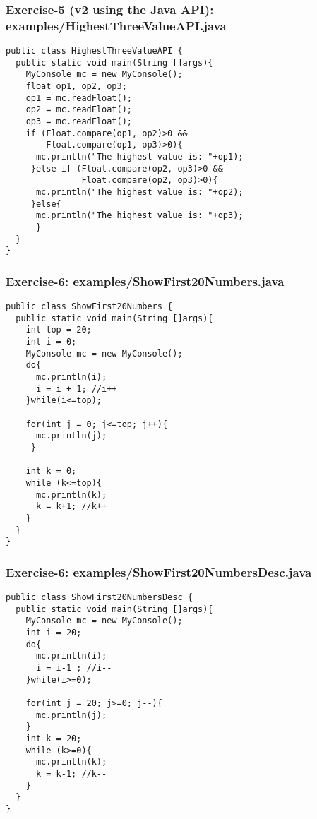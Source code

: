 \documentclass[xcolor=dvipsnames,dvip,notes=show,table]{beamer}
\begin{document}
\begin{frame}[fragile]
\frametitle{Exercise-5 (v2 using the Java API): examples/HighestThreeValueAPI.java}
\scriptsize
\begin{lstlisting}
public class HighestThreeValueAPI {
  public static void main(String []args){
    MyConsole mc = new MyConsole();
    float op1, op2, op3;
    op1 = mc.readFloat();
    op2 = mc.readFloat();
    op3 = mc.readFloat();
    if (Float.compare(op1, op2)>0 && 
        Float.compare(op1, op3)>0){
      mc.println("The highest value is: "+op1);
     }else if (Float.compare(op2, op3)>0 && 
               Float.compare(op2, op3)>0){
      mc.println("The highest value is: "+op2);
     }else{
      mc.println("The highest value is: "+op3);
      }
  }
}
\end{lstlisting}
\end{frame}




\begin{frame}[fragile]
\frametitle{Exercise-6: examples/ShowFirst20Numbers.java}
\scriptsize
\begin{lstlisting}
public class ShowFirst20Numbers {
  public static void main(String []args){
    int top = 20;
    int i = 0;
    MyConsole mc = new MyConsole();
    do{
      mc.println(i);
      i = i + 1; //i++
    }while(i<=top);

    for(int j = 0; j<=top; j++){
      mc.println(j);
     }
    
    int k = 0;
    while (k<=top){
      mc.println(k);
      k = k+1; //k++
    }
  }
}
\end{lstlisting}
\end{frame}




\begin{frame}[fragile]
\frametitle{Exercise-6: examples/ShowFirst20NumbersDesc.java}
\scriptsize
\begin{lstlisting}
public class ShowFirst20NumbersDesc {
  public static void main(String []args){		
    MyConsole mc = new MyConsole();
    int i = 20;
    do{
      mc.println(i);
      i = i-1 ; //i--
    }while(i>=0);

    for(int j = 20; j>=0; j--){
      mc.println(j);
    }
    int k = 20;
    while (k>=0){
      mc.println(k);
      k = k-1; //k--
    }
  }
}
\end{lstlisting}
\end{frame}
\end{document}
